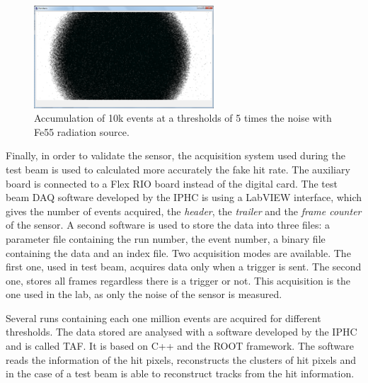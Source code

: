   \begin{figure}[!h]
    \centering
    \includegraphics[width=0.6\textwidth]{Pictures/labTests/10kEvents_Fe55_cut5sigma.png}
    \caption{Accumulation of 10k events at a thresholds of 5 times the noise with Fe55 radiation source.}
    \label{fig:fe55}
  \end{figure}

  Finally, in order to validate the sensor, the acquisition system used during the test beam is used to calculated more accurately the fake hit rate.
  The auxiliary board is connected to a  Flex RIO board instead of the digital card.
  The test beam DAQ software developed by the IPHC is using a LabVIEW interface, which gives the number of events acquired, the \textit{header}, the \textit{trailer} and the \textit{frame counter} of the sensor.
  A second software is used to store the data into three files: a parameter file containing the run number, the event number, a binary file containing the data and an index file.
  Two acquisition modes are available. 
  The first one, used in test beam, acquires data only when a trigger is sent.
  The second one, stores all frames regardless there is a trigger or not. 
  This acquisition is the one used in the lab, as only the noise of the sensor is measured.
   
  Several runs containing each one million events are acquired for different thresholds. 
  The data stored are analysed with a software developed by the IPHC and is called \gls{TAF}.
  It is based on C++ and the ROOT framework.
  The software reads the information of the hit pixels, reconstructs the clusters of hit pixels and in the case of a test beam is able to reconstruct tracks from the hit information.

